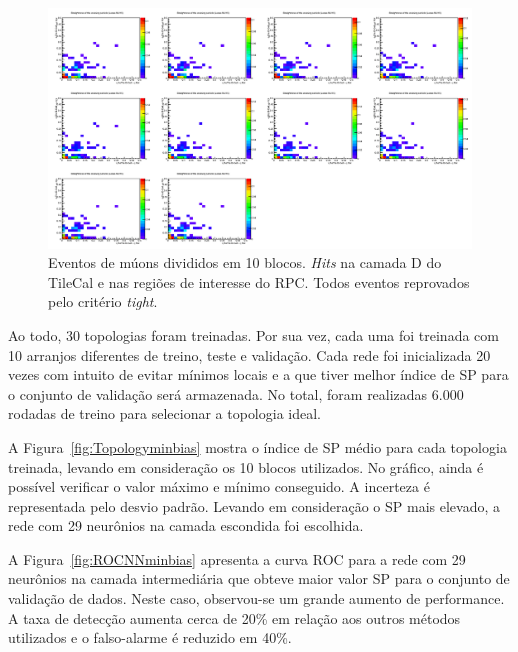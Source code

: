 \begin{figure}
    \centering
    \includegraphics[width=\textheight]{images/minbias/cluster_phi_eta_noclass.png}
    \caption{Eventos de múons divididos em 10 blocos. \emph{Hits} na camada D do
    TileCal e nas regiões de interesse do RPC. Todos eventos reprovados pelo
    critério \emph{tight}.}
    \label{fig:blocominbias-3}
\end{figure}

Ao todo, 30 topologias foram treinadas. Por sua vez, cada uma foi treinada com
10 arranjos diferentes de treino, teste e validação. Cada rede foi inicializada
20 vezes com intuito de evitar mínimos locais e a que tiver melhor índice de SP
para o conjunto de validação será armazenada. No total, foram realizadas 6.000
rodadas de treino para selecionar a topologia ideal.

A Figura~\ref{fig:Topologyminbias} mostra o índice de SP médio para cada
topologia treinada, levando em consideração os 10 blocos utilizados. No gráfico,
ainda é possível verificar o valor máximo e mínimo conseguido. A incerteza é
representada pelo desvio padrão. Levando em consideração o SP mais elevado, a
rede com 29 neurônios na camada escondida foi escolhida.

A Figura~\ref{fig:ROCNNminbias} apresenta a  curva ROC para a rede com 29
neurônios na camada intermediária que obteve maior valor SP para o conjunto de
validação de dados. Neste caso, observou-se um grande aumento de performance. A
taxa de detecção aumenta cerca de 20\% em relação aos outros métodos utilizados
e o falso-alarme é reduzido em 40\%.

